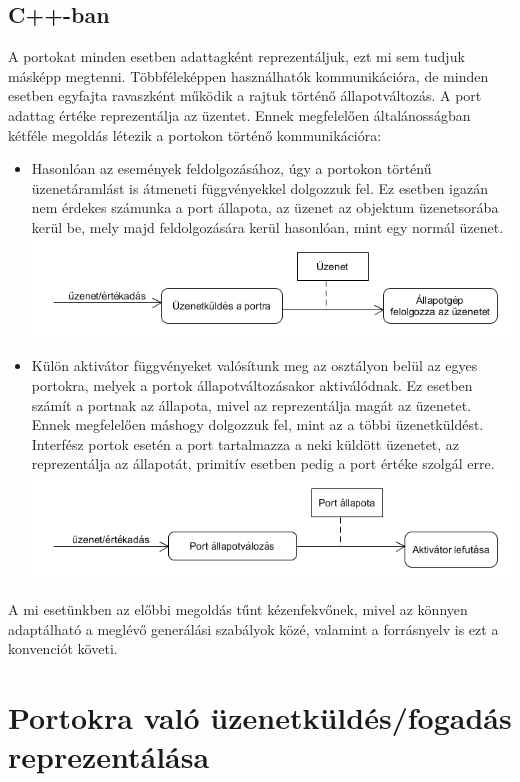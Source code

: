 \documentclass[a4paper,12pt]{report}
\begin{document}
\subsection{C++-ban}
A portokat minden esetben adattagként reprezentáljuk, ezt mi sem tudjuk másképp megtenni. Többféleképpen használhatók kommunikációra, de minden esetben egyfajta ravaszként működik a rajtuk történő állapotváltozás. A port adattag értéke reprezentálja az üzentet. Ennek megfelelően általánosságban kétféle megoldás létezik a portokon történő kommunikációra:
\begin{itemize}
\item Hasonlóan az események feldolgozásához, úgy a portokon történű üzenetáramlást is átmeneti függvényekkel dolgozzuk fel. Ez esetben igazán nem érdekes számunka a port állapota, az üzenet az objektum üzenetsorába kerül be, mely majd feldolgozására kerül hasonlóan, mint egy normál üzenet.  \\
\includegraphics[scale=0.6]{port_actfun.png}
\item Külön aktivátor függvényeket valósítunk meg az osztályon belül az egyes portokra, melyek a portok állapotváltozásakor aktiválódnak. Ez esetben számít a portnak az állapota, mivel az reprezentálja magát az üzenetet. Ennek megfelelően máshogy dolgozzuk fel, mint az a többi üzenetküldést. Interfész portok esetén a port tartalmazza a neki küldött üzenetet, az reprezentálja az állapotát, primitív esetben pedig a port értéke szolgál erre. \\
\includegraphics[scale=0.6]{port_sendm.png} \\
\end{itemize}

A mi esetünkben az előbbi megoldás tűnt kézenfekvőnek, mivel az könnyen adaptálható a meglévő generálási szabályok közé, valamint a forrásnyelv is ezt a konvenciót követi. 

\section{Portokra való üzenetküldés/fogadás reprezentálása} \label{message}
\end{document}
